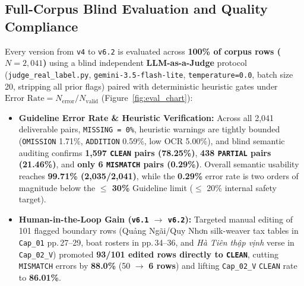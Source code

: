 \documentclass[a4paper]{article}
\begin{document}
\subsection{Full-Corpus Blind Evaluation and Quality Compliance}
Every version from \texttt{v4} to \texttt{v6.2} is evaluated across \textbf{100\% of corpus rows ($N=2{,}041$)} using a blind independent \textbf{LLM-as-a-Judge} protocol (\texttt{judge\_real\_label.py}, \texttt{gemini-3.5-flash-lite}, \texttt{temperature=0.0}, batch size 20, stripping all prior flags) paired with deterministic heuristic gates under $\text{Error Rate} = N_{\text{error}} / N_{\text{valid}}$ (Figure~\ref{fig:eval_chart}):
\begin{itemize}
  \item \textbf{Guideline Error Rate \& Heuristic Verification:} Across all 2,041 deliverable pairs, \texttt{MISSING = 0\%}, heuristic warnings are tightly bounded (\texttt{OMISSION} 1.71\%, \texttt{ADDITION} 0.59\%, low OCR 5.00\%), and blind semantic auditing confirms \textbf{1,597 \texttt{CLEAN} pairs (78.25\%)}, \textbf{438 \texttt{PARTIAL} pairs (21.46\%)}, and \textbf{only 6 \texttt{MISMATCH} pairs (0.29\%)}. Overall semantic usability reaches \textbf{99.71\% (2,035/2,041)}, while the \textbf{0.29\%} error rate is two orders of magnitude below the \textbf{$\le$ 30\%} Guideline limit ($\le$ 20\% internal safety target).
  \item \textbf{Human-in-the-Loop Gain (\texttt{v6.1} $\to$ \texttt{v6.2}):} Targeted manual editing of 101 flagged boundary rows (Quảng Ngãi/Quy Nhơn silk-weaver tax tables in \texttt{Cap\_01} pp.\,27--29, boat rosters in pp.\,34--36, and \textit{Hà Tiên thập vịnh} verse in \texttt{Cap\_02\_V}) promoted \textbf{93/101 edited rows directly to \texttt{CLEAN}}, cutting \texttt{MISMATCH} errors by \textbf{88.0\%} (50 $\to$ \textbf{6 rows}) and lifting \texttt{Cap\_02\_V} \texttt{CLEAN} rate to \textbf{86.01\%}.
\end{itemize}
\end{document}

